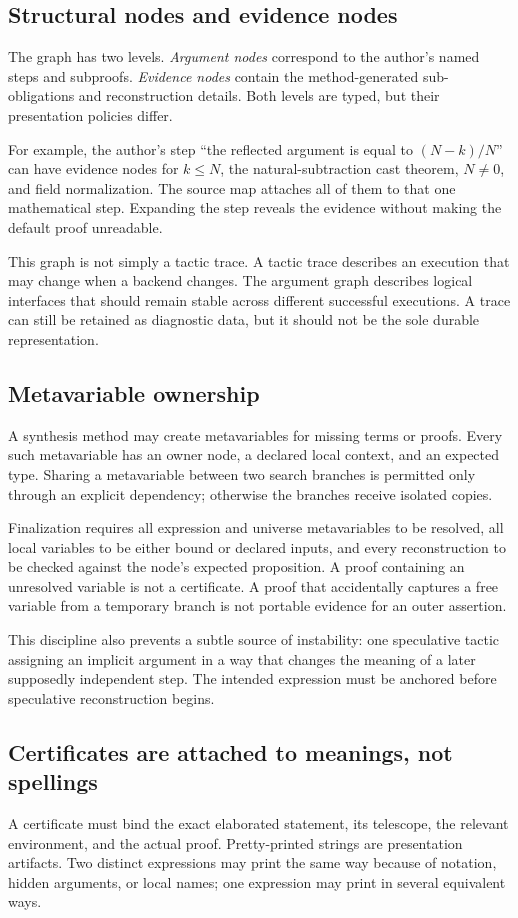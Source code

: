 \documentclass[11pt,a4paper]{article}
\theoremstyle{remark}
\begin{document}
\subsection{Structural nodes and evidence nodes}
The graph has two levels. \emph{Argument nodes} correspond to the author's named steps and subproofs. \emph{Evidence nodes} contain the method-generated sub-obligations and reconstruction details. Both levels are typed, but their presentation policies differ.

For example, the author's step ``the reflected argument is equal to $(N-k)/N$'' can have evidence nodes for $k\leq N$, the natural-subtraction cast theorem, $N\neq0$, and field normalization. The source map attaches all of them to that one mathematical step. Expanding the step reveals the evidence without making the default proof unreadable.

This graph is not simply a tactic trace. A tactic trace describes an execution that may change when a backend changes. The argument graph describes logical interfaces that should remain stable across different successful executions. A trace can still be retained as diagnostic data, but it should not be the sole durable representation.

\subsection{Metavariable ownership}
A synthesis method may create metavariables for missing terms or proofs. Every such metavariable has an owner node, a declared local context, and an expected type. Sharing a metavariable between two search branches is permitted only through an explicit dependency; otherwise the branches receive isolated copies.

Finalization requires all expression and universe metavariables to be resolved, all local variables to be either bound or declared inputs, and every reconstruction to be checked against the node's expected proposition. A proof containing an unresolved variable is not a certificate. A proof that accidentally captures a free variable from a temporary branch is not portable evidence for an outer assertion.

This discipline also prevents a subtle source of instability: one speculative tactic assigning an implicit argument in a way that changes the meaning of a later supposedly independent step. The intended expression must be anchored before speculative reconstruction begins.

\subsection{Certificates are attached to meanings, not spellings}
A certificate must bind the exact elaborated statement, its telescope, the relevant environment, and the actual proof. Pretty-printed strings are presentation artifacts. Two distinct expressions may print the same way because of notation, hidden arguments, or local names; one expression may print in several equivalent ways.
\end{document}
